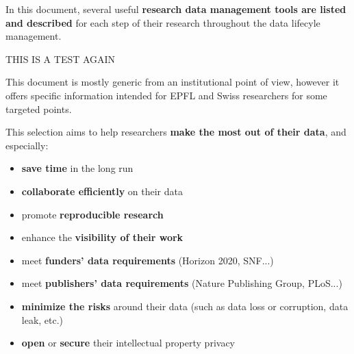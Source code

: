 In this document, several useful \textbf{research data management tools are listed and described} for each step of their research throughout the data lifecyle management.

THIS IS A TEST AGAIN

\vspace{0.5cm}

This document is mostly generic from an institutional point of view, however it offers specific information intended for EPFL and Swiss researchers for some targeted points.

\vspace{0.5cm}

\noindent This selection aims to help researchers \textbf{make the most out of their data}, and especially:
\begin{itemize}
\item \textbf{save time} in the long run
\item \textbf{collaborate efficiently } on their data 
\item promote \textbf{reproducible research}
\item enhance the \textbf{visibility of their work} 
\item meet \textbf{funders' data requirements} (Horizon 2020, SNF...) 
\item meet \textbf{publishers' data requirements} (Nature Publishing Group, PLoS...) 
\item \textbf{minimize the risks} around their data (such as data loss or corruption, data leak, etc.)
\item  \textbf{open} or \textbf{secure} their intellectual property privacy
\end{itemize}



